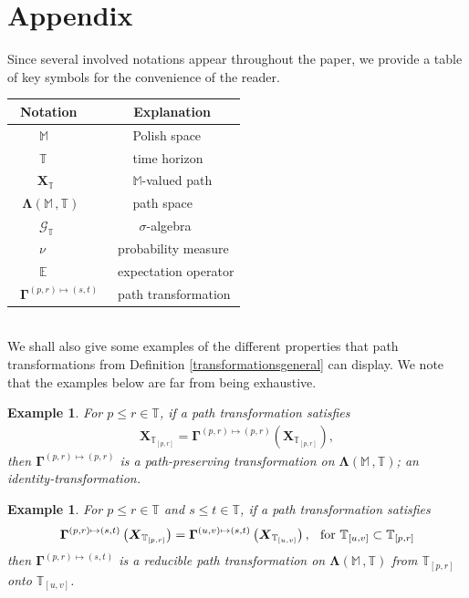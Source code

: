 \documentclass[12pt,a4paper]{article}
\newtheorem{ex}[thm]{Example}
\def\M{\mathbb{M}}
\def\T{\mathbb{T}}
\def\G{\mathscr{G}}
\begin{document}
\section{Appendix}
Since several involved notations appear throughout the paper, we provide a table of key symbols for the convenience of the reader.
\begin{table}[ht]
\centering
\begin{tabular}{ | p{2cm} | p{4cm} |}
\hline
\,\,\,\textbf{Notation} & \,\,\,\,\,\,\,\, \textbf{Explanation} \\
\hline
\,\,\,\,\,\,\,\,\,\,  $\M$ & \,\,\,\,\,\,\,\, Polish space \\
\hline
\,\,\,\,\,\,\,\,\,\,  $\T$ & \,\,\,\,\,\,\,\, time horizon \\
\hline
\,\,\,\,\,\,\,\,\, $\boldsymbol{X}_{\T}$ & \,\,\,\,\,\,\,\, $\M$-valued path \\
\hline
\,\, $\boldsymbol{\Lambda}(\mathbb M \,, \T)$ & \,\,\,\,\,\,\,\, path space \\
\hline
\,\,\,\,\,\,\,\,\,\, $\G_{\T}$ & \,\,\,\,\,\,\,\,\,\,\, $\sigma$-algebra \\
\hline
\,\,\,\,\,\,\,\,\,\, $\nu$ & \, probability measure \\
\hline
\,\,\,\,\,\,\,\,\,\, $\mathbb{E}$ & \, expectation operator \\
\hline
\, $\boldsymbol{\Gamma}^{(p,r)\mapsto(s,t)}$ & \, path transformation \\
\hline
\end{tabular}
\end{table}
\\
We shall also give some examples of the different properties that path transformations from Definition \ref{transformationsgeneral} can display. We note that the examples below are far from being exhaustive.
\begin{ex}
\emph{For $p\leq r \in \T$, if a path transformation satisfies
\begin{align}
\boldsymbol{X}_{\T_{[p,r]}} = \boldsymbol{\Gamma}^{(p,r)\mapsto(p,r)}\left( \boldsymbol{X}_{\T_{[p,r]}}\right), 
\end{align}
then $\boldsymbol{\Gamma}^{(p,r)\mapsto(p,r)}$ is a path-preserving transformation on $\boldsymbol{\Lambda}(\mathbb M \,, \T)$; an identity-transformation.}
\end{ex}

\begin{ex}
\emph{For $p\leq r \in \T$ and $s\leq t \in \T$, if a path transformation satisfies
\begin{align}
\boldsymbol{\Gamma}^{(p,r)\mapsto(s,t)}\left( \boldsymbol{X}_{\T_{[p,r]}}\right) = \boldsymbol{\Gamma}^{(u,v)\mapsto(s,t)}\left( \boldsymbol{X}_{\T_{[u,v]}}\right), \hspace{0.1in} \text{for $\T_{[u,v]}\subset \T_{[p,r]}$} 
\end{align}
then $\boldsymbol{\Gamma}^{(p,r)\mapsto(s,t)}$ is a reducible path transformation on $\boldsymbol{\Lambda}(\mathbb M \,, \T)$ from $\T_{[p,r]}$ onto $\T_{[u,v]}$.}
\end{ex}
\end{document}
